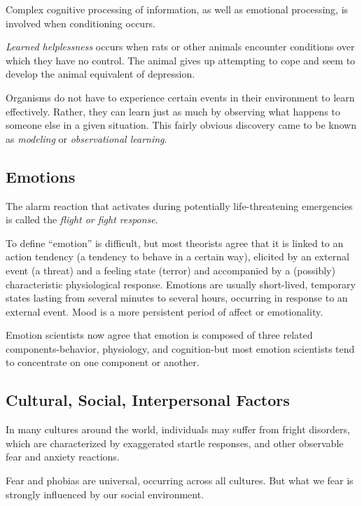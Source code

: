 Complex cognitive processing of information, as well as emotional processing, is involved when conditioning occurs.

\begin{definition}\label{def:Learned_Helplessness}
  \emph{Learned helplessness} occurs when rats or other animals encounter conditions over which they have no control.
  The animal gives up attempting to cope and seem to develop the animal equivalent of depression.
\end{definition}

Organisms do not have to experience certain events in their environment to learn effectively.
Rather, they can learn just as much by observing what happens to someone else in a given situation.
This fairly obvious discovery came to be known as \emph{modeling} or \emph{observational learning}.

\subsection{Emotions}\label{subsec:Emotions}
The alarm reaction that activates during potentially life-threatening emergencies is called the \emph{flight or fight response}.

To define ``emotion'' is difficult, but most theorists agree that it is linked to an action tendency (a tendency to behave in a certain way), elicited by an external event (a threat) and a feeling state (terror) and accompanied by a (possibly) characteristic physiological response.
Emotions are usually short-lived, temporary states lasting from several minutes to several hours, occurring in response to an external event.
Mood is a more persistent period of affect or emotionality.

Emotion scientists now agree that emotion is composed of three related components-behavior, physiology, and cognition-but most emotion scientists tend to concentrate on one component or another.

\subsection{Cultural, Social, Interpersonal Factors}\label{subsec:Cultural_Social_Interpersonal_Factors}
In many cultures around the world, individuals may suffer from fright disorders, which are characterized by exaggerated startle responses, and other observable fear and anxiety reactions.

Fear and phobias are universal, occurring across all cultures.
But what we fear is strongly influenced by our social environment.

